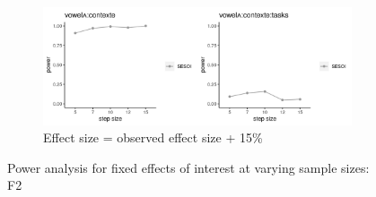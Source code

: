 \documentclass[12 pt]{article}
\begin{document}
\begin{figure}
	
	\begin{subfigure}[t]{0.8\textwidth}
		\centering
		\includegraphics[width=\textwidth]{powerplot_f2_plus15} 
		\caption{Effect size = observed effect size + 15\%} \label{f2_plus15}
	\end{subfigure}
	
	\caption{Power analysis for fixed effects of interest at varying sample sizes: F2}
	
\end{figure}
\end{document}
